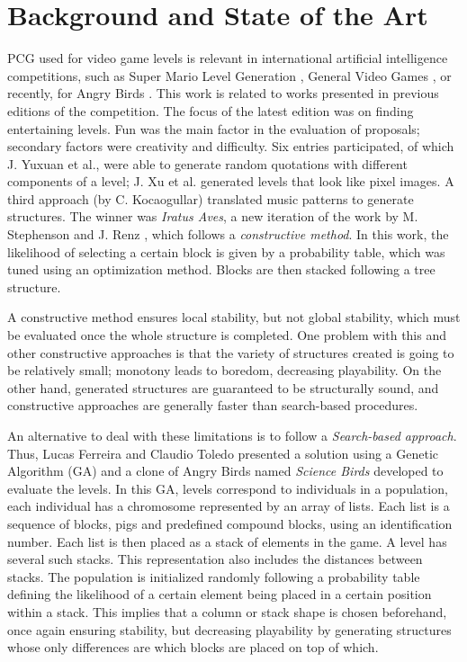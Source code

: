 \documentclass[a4paper,twoside]{article}
\begin{document}
\section{Background and State of the Art}
\label{sec:soa}

PCG used for video game levels is relevant in international artificial
intelligence competitions, such as Super Mario Level Generation
\cite{MarioAI_Level_12}, General Video Games
\cite{GAIG_LevelGeneration_18,Khalifa_GVGLG_16}, or recently, for
Angry Birds \cite{AngryBirds_LevelGeneration_18}. This work is related
to works presented in previous editions of the competition.  The focus
of the latest edition \cite{AngryBirds_LevelGeneration_18} was on
finding entertaining levels. Fun was the main factor in the evaluation
of proposals; secondary factors were creativity and difficulty.  Six
entries participated, of which J. Yuxuan et al., were able to generate
random quotations with different components of a level; J. Xu et
al. generated levels that look like pixel images. A third approach (by
C. Kocaogullar) translated music patterns to generate structures. The
winner was {\em Iratus Aves}, a new iteration of the work by M. Stephenson
and J. Renz \cite{stephenson2017generating,stephenson2016procedural},
which follows a \textit{constructive method}. In this work, the
likelihood of selecting a certain block is given by a probability
table, which was tuned using an optimization method. Blocks are then
stacked following a tree structure.

A constructive method ensures local stability, but not global
stability, which must be evaluated once the whole structure is
completed. One problem with this and other constructive approaches is
that the variety of structures created is going to be relatively
small; monotony leads to boredom, decreasing playability. On the other
hand, generated structures are guaranteed to be structurally sound,
and constructive approaches are generally faster than search-based
procedures. 


An alternative to deal with these limitations is to follow a
\textit{Search-based approach}. Thus, Lucas Ferreira and Claudio
Toledo \cite{ferreira2014search,Ferreira2014ASA} presented a solution using a Genetic
Algorithm (GA) and a clone of Angry Birds named \textit{Science Birds} developed
to evaluate the levels. In this GA, levels correspond to
individuals in a population, each individual has a chromosome
represented by an array of lists. Each list is a sequence of blocks,
pigs and predefined compound blocks, using an identification
number. Each list is then placed as a stack of elements in the game. A
level has several such stacks. This representation also includes the
distances between stacks. The population is initialized randomly
following a probability table defining the likelihood of a certain
element being placed in a certain position within a stack. This
implies that a column or stack shape is chosen beforehand, once again
ensuring stability, but decreasing playability by generating
structures whose only differences are which blocks are placed on top
of which. 
\end{document}
